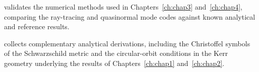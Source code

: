 \begin{leftbarbox}
 validates the numerical methods used in Chapters~\ref{ch:chap3} and~\ref{ch:chap4}, comparing the ray-tracing and quasinormal mode codes against known analytical and reference results.
\end{leftbarbox}

\begin{leftbarbox}
 collects complementary analytical derivations, including the Christoffel symbols of the Schwarzschild metric and the circular-orbit conditions in the Kerr geometry underlying the results of Chapters~\ref{ch:chap1} and~\ref{ch:chap2}.
\end{leftbarbox}

\setlength{\parskip}{0pt}
\setlength{\parindent}{1.5em}
